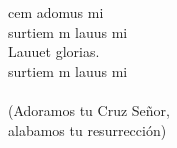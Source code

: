 \begin{cancion}%
	cem adomus mi\\
	surtiem m lauus mi \\
	Lauuet glorias.\\
	surtiem m lauus mi\\
	\jump\\
(Adoramos tu Cruz Señor,\\
 alabamos tu resurrección)\\
\end{cancion}%
